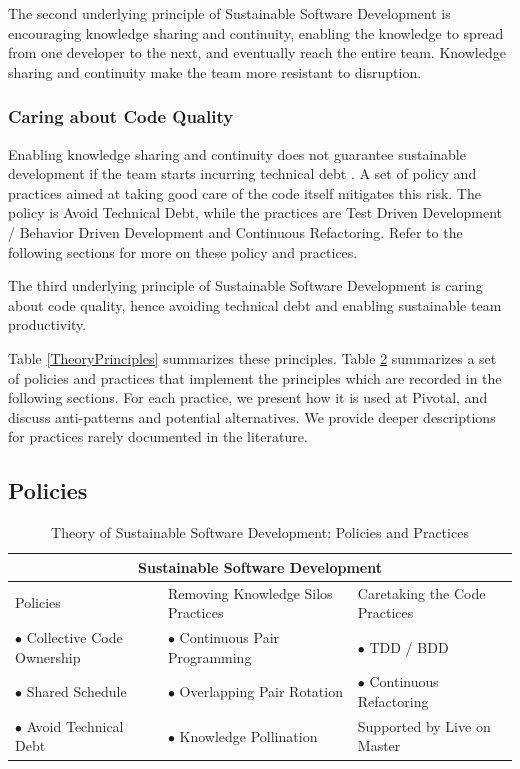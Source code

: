 \begin{table}[]
The second underlying principle of Sustainable Software Development is encouraging knowledge sharing and continuity, enabling the knowledge to spread from one developer to the next, and eventually reach the entire team. Knowledge sharing and continuity make the team more resistant to disruption. 

\subsubsection{Caring about Code Quality}

Enabling knowledge sharing and continuity does not guarantee sustainable development if the team starts incurring technical debt  \cite{McConnellTechnicalDebt}. A set of policy and practices aimed at taking good care of the code itself mitigates this risk. The policy is Avoid Technical Debt, while the practices are Test Driven Development / Behavior Driven Development and Continuous Refactoring. Refer to the following sections for more on these policy and practices.

The third underlying principle of Sustainable Software Development is caring about code quality, hence avoiding technical debt and enabling sustainable team productivity.

Table \ref{TheoryPrinciples} summarizes these principles. Table \ref{TheoryPractices}  summarizes a set of policies and practices that implement the principles which are recorded in the following sections. For each practice, we present how it is used at Pivotal, and discuss anti-patterns and potential alternatives. We provide deeper descriptions for practices rarely documented in the literature.
\subsection{Policies}

\begin{table}[]
\renewcommand{\arraystretch}{1.5}
\centering
\caption{Theory of Sustainable Software Development: Policies and Practices}
\label{TheoryPractices}
\begin{tabular}{l|l|l}
\hline
\multicolumn{3}{c}{Sustainable Software Development}                               \\
\hline
Policies                  & Removing Knowledge Silos Practices & Caretaking the Code Practices       \\
$\bullet$ Collective Code Ownership & $\bullet$ Continuous Pair Programming         & $\bullet$  TDD / BDD                   \\
$\bullet$ Shared Schedule           & $\bullet$ Overlapping Pair Rotation & $\bullet$ Continuous Refactoring      \\
$\bullet$ Avoid Technical Debt      & $\bullet$  Knowledge Pollination    & Supported by Live on Master \\ 
\hline
\end{tabular}
\end{table}


\end{table}
